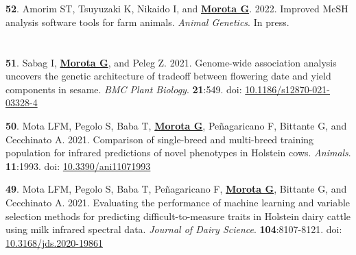 \documentclass[margin,line,10pt]{res}
\newenvironment{list1}{
  \begin{list}{\ding{113}}{%
      \setlength{\itemsep}{0in}
      \setlength{\parsep}{0in} \setlength{\parskip}{0in}
      \setlength{\topsep}{0in} \setlength{\partopsep}{0in} 
      \setlength{\leftmargin}{0.17in}}}{\end{list}}
\begin{document}
\begin{resume}
\section{}
\begin{list1}

   \item [{\bf 52}.] Amorim ST, Tsuyuzaki K, Nikaido I, and \textbf{\underline{Morota G}}. 2022. Improved MeSH analysis software tools for farm animals.  \emph{Animal Genetics}. In press. 

\end{list1}





\section{}
\begin{list1}

    \item [{\bf 51}.] Sabag I, \textbf{\underline{Morota G}}, and Peleg Z. 2021. Genome-wide association analysis uncovers the genetic architecture of tradeoff between flowering date and yield components in sesame.  \emph{BMC Plant Biology}. \textbf{21}:549. doi: \textcolor{blue}{\href{https://doi.org/10.1186/s12870-021-03328-4}{10.1186/s12870-021-03328-4}} 

      \vspace{0.5cm}

\item [{\bf 50}.] Mota LFM, Pegolo S, Baba T, \textbf{\underline{Morota G}}, Pe\~{n}agaricano F, Bittante G, and Cecchinato A. 2021. Comparison of single-breed and multi-breed training population for infrared predictions of novel phenotypes in Holstein cows. \emph{Animals}. \textbf{11}:1993. doi: \textcolor{blue}{\href{https://doi.org/10.3390/ani11071993}{10.3390/ani11071993}}

      \vspace{0.5cm}
  
\item [{\bf 49}.] Mota LFM, Pegolo S, Baba T, Pe\~{n}agaricano F, \textbf{\underline{Morota G}}, Bittante G, and Cecchinato A. 2021. Evaluating the performance of machine learning and variable selection methods for predicting difficult-to-measure traits in Holstein dairy cattle using milk infrared spectral data. \emph{Journal of Dairy Science}. \textbf{104}:8107-8121. doi: \textcolor{blue}{\href{https://doi.org/10.3168/jds.2020-19861}{10.3168/jds.2020-19861}}


\end{list1}
\end{resume}
\end{document}
